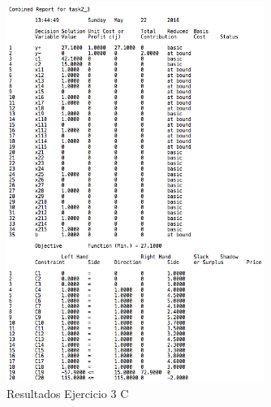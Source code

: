 \documentclass[10pt, a4paper]{article}
\begin{document}
		\begin{figure}[H]
		\centering
			\includegraphics[width=0.75\textwidth]{res/exercise-3-c-result.png}
			\caption{Resultados Ejercicio 3 C}
  			\label{fig:ej3c}
		\end{figure}
\end{document}
